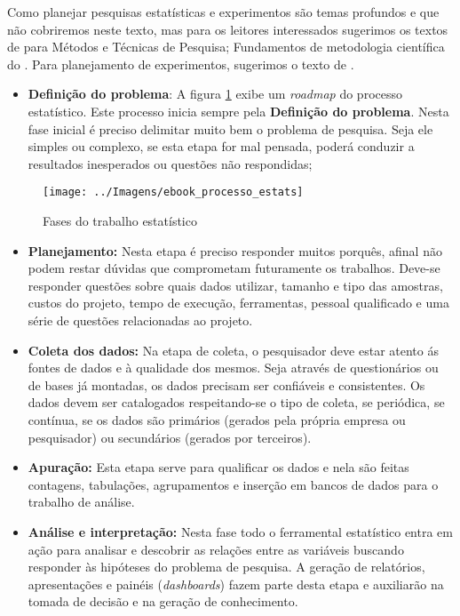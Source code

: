 \documentclass[12pt,]{style/krantz}
\providecommand{\tightlist}{%
  \setlength{\itemsep}{0pt}\setlength{\parskip}{0pt}}
\theoremstyle{definition}
\theoremstyle{definition}
\theoremstyle{definition}
\theoremstyle{remark}
\begin{document}
Como planejar pesquisas estatísticas e experimentos são temas profundos
e que não cobriremos neste texto, mas para os leitores interessados
sugerimos os textos de \citep{gil2008metodos} para Métodos e Técnicas de
Pesquisa; Fundamentos de metodologia científica do
\citep{koche2016fundamentos}. Para planejamento de experimentos,
sugerimos o texto de \citep{montgomery2017design}.

\begin{itemize}
\tightlist
\item
  \textbf{Definição do problema}: A figura \ref{fig:fig00} exibe um
  \emph{roadmap} do processo estatístico. Este processo inicia sempre
  pela \textbf{Definição do problema}. Nesta fase inicial é preciso
  delimitar muito bem o problema de pesquisa. Seja ele simples ou
  complexo, se esta etapa for mal pensada, poderá conduzir a resultados
  inesperados ou questões não respondidas;
\end{itemize}

\begin{figure}[H]

{\centering \texttt{[image: ../Imagens/ebook\_processo\_estats]} 

}

\caption{Fases do trabalho estatístico}\label{fig:fig00}
\end{figure}

\begin{itemize}
\item
  \textbf{Planejamento: } Nesta etapa é preciso responder muitos
  porquês, afinal não podem restar dúvidas que comprometam futuramente
  os trabalhos. Deve-se responder questões sobre quais dados utilizar,
  tamanho e tipo das amostras, custos do projeto, tempo de execução,
  ferramentas, pessoal qualificado e uma série de questões relacionadas
  ao projeto.
\item
  \textbf{Coleta dos dados: } Na etapa de coleta, o pesquisador deve
  estar atento ás fontes de dados e à qualidade dos mesmos. Seja através
  de questionários ou de bases já montadas, os dados precisam ser
  confiáveis e consistentes. Os dados devem ser catalogados
  respeitando-se o tipo de coleta, se periódica, se contínua, se os
  dados são primários (gerados pela própria empresa ou pesquisador) ou
  secundários (gerados por terceiros).
\item
  \textbf{Apuração: } Esta etapa serve para qualificar os dados e nela
  são feitas contagens, tabulações, agrupamentos e inserção em bancos de
  dados para o trabalho de análise.
\item
  \textbf{Análise e interpretação: } Nesta fase todo o ferramental
  estatístico entra em ação para analisar e descobrir as relações entre
  as variáveis buscando responder às hipóteses do problema de pesquisa.
  A geração de relatórios, apresentações e painéis (\emph{dashboards})
  fazem parte desta etapa e auxiliarão na tomada de decisão e na geração
  de conhecimento.
\end{itemize}
\end{document}
